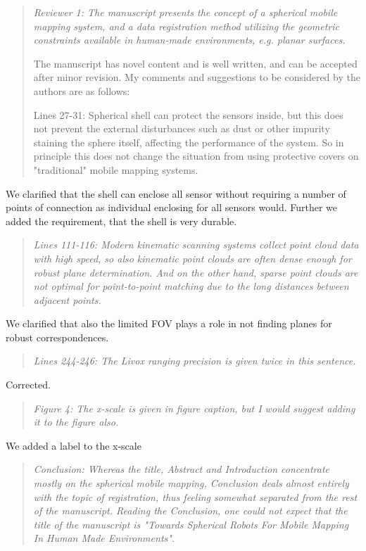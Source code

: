 \documentclass{article}
\newenvironment{itquote}
  {\begin{quote}\itshape}
  {\end{quote}\ignorespacesafterend}
\begin{document}
\begin{itquote}
Reviewer 1: The manuscript presents the concept of a spherical
mobile mapping system, and a data registration method utilizing the
geometric constraints available in human-made environments,
e.g. planar surfaces.

The manuscript has novel content and is well written, and can be
accepted after minor revision. My comments and suggestions to be
considered by the authors are as follows:
 
Lines 27-31: Spherical shell can protect the sensors inside, but
this does not prevent the external disturbances such as dust or
other impurity staining the sphere itself, affecting the performance
of the system. So in principle this does not change the situation
from using protective covers on "traditional" mobile mapping
systems.
\end{itquote}

We clarified that the shell can enclose all sensor without requiring a 
number of points of connection as individual enclosing for all sensors
would. Further we added the requirement, that the shell is very 
durable.

\begin{itquote} 
Lines 111-116: Modern kinematic scanning systems collect point cloud
data with high speed, so also kinematic point clouds are often dense
enough for robust plane determination. And on the other hand, sparse
point clouds are not optimal for point-to-point matching due to the
long distances between adjacent points.
\end{itquote}

We clarified that also the limited FOV plays a role in not finding 
planes for robust correspondences. 

\begin{itquote}
Lines 244-246: The Livox ranging precision is given twice in this
sentence.
\end{itquote}

Corrected.

\begin{itquote}
Figure 4: The x-scale is given in figure caption, but I would
suggest adding it to the figure also.
\end{itquote}

We added a label to the x-scale

\begin{itquote}
Conclusion: Whereas the title, Abstract and Introduction concentrate
mostly on the spherical mobile mapping, Conclusion deals almost
entirely with the topic of registration, thus feeling somewhat
separated from the rest of the manuscript. Reading the Conclusion,
one could not expect that the title of the manuscript is "Towards
Spherical Robots For Mobile Mapping In Human Made Environments". 
\end{itquote}
\end{document}
